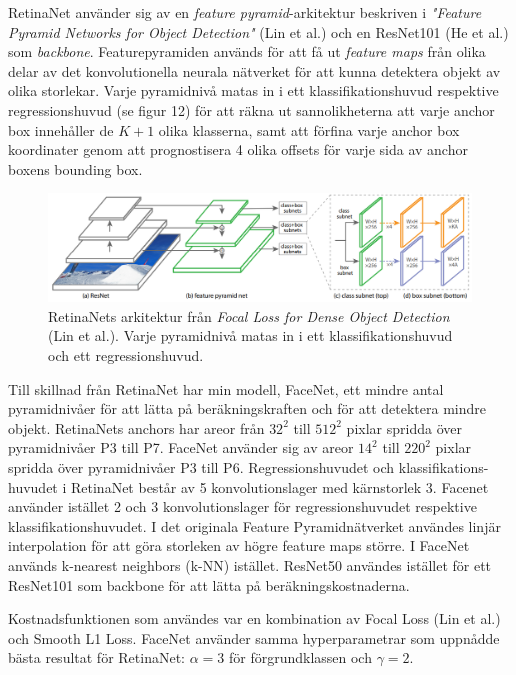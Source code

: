 \documentclass[a4paper,11pt,twoside]{article}
\begin{document}
RetinaNet använder sig av en \textit{feature pyramid}-arkitektur beskriven i \textit{"Feature Pyramid Networks for Object Detection"} (Lin et al.) och en ResNet101 (He et al.) som \textit{backbone}. Featurepyramiden används för att få ut \textit{feature maps} från olika delar av det konvolutionella neurala nätverket för att kunna detektera objekt av olika storlekar. Varje pyramidnivå matas in i ett klassifikationshuvud respektive regressionshuvud (se figur 12) för att räkna ut sannolikheterna att varje anchor box innehåller de $K+1$ olika klasserna, samt att förfina varje anchor box koordinater genom att prognostisera 4 olika offsets för varje sida av anchor boxens bounding box. \cite{resnet} \cite{retinanet} \cite{fpn} 

\begin{figure}[h]\label{figiou}
	\centering
  		\includegraphics[scale=0.38]{retinanet.png}
  	\caption{RetinaNets arkitektur från \textit{Focal Loss for Dense Object Detection} (Lin et al.). Varje pyramidnivå matas in i ett klassifikationshuvud och ett regressionshuvud. \cite{retinanet}}
\end{figure}

Till skillnad från RetinaNet har min modell, FaceNet, ett mindre antal pyramidnivåer för att lätta på beräkningskraften och för att detektera mindre objekt. RetinaNets anchors har areor från $32^2$ till $512^2$ pixlar spridda över pyramidnivåer P3 till P7. FaceNet använder sig av areor $14^2$ till $220^2$ pixlar spridda över pyramidnivåer P3 till P6. Regressionshuvudet och klassifikations- huvudet i RetinaNet består av 5 konvolutionslager med kärnstorlek 3. Facenet använder istället 2 och 3 konvolutionslager för regressionshuvudet respektive klassifikationshuvudet. I det originala Feature Pyramidnätverket användes linjär interpolation för att göra storleken av högre feature maps större. I FaceNet används k-nearest neighbors (k-NN) istället. ResNet50 användes istället för ett ResNet101 som backbone för att lätta på beräkningskostnaderna. \cite{resnet} \cite{retinanet} \cite{fpn} 

Kostnadsfunktionen som användes var en kombination av Focal Loss (Lin et al.) och Smooth L1 Loss. FaceNet använder samma hyperparametrar som uppnådde bästa resultat för RetinaNet: $\alpha = 3$ för förgrundklassen och $\gamma=2$. \cite{retinanet}
\end{document}

